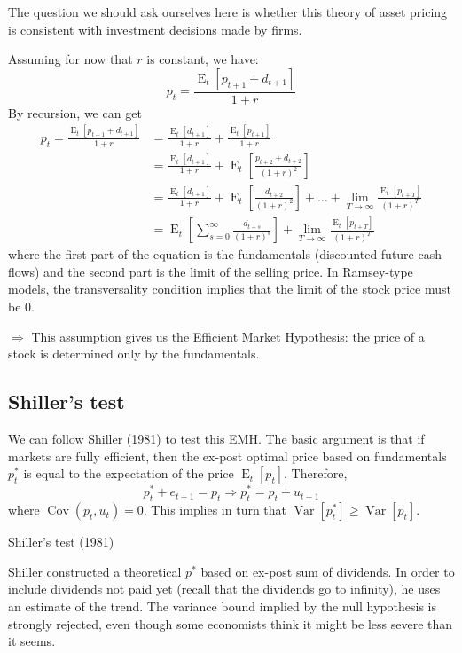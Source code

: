 \documentclass[12pt]{report}
\newcommand{\Et}[1]{\operatorname{E}_t\left[#1\right]}
\newcommand{\V}[1]{\operatorname{Var}\left[#1\right]}
\newcommand{\cov}[1]{\operatorname{Cov}\left(#1\right)}
\begin{document}
The question we should ask ourselves here is whether this theory of asset pricing is consistent with investment decisions made by firms.

Assuming for now that $r$ is constant, we have: $$p_t = \frac{\Et{p_{t+1} + d_{t+1}}}{1+r} $$
By recursion, we can get \begin{align*}
p_t = \frac{\Et{p_{t+1} + d_{t+1}}}{1+r} & = \frac{\Et{d_{t+1}}}{1+r} + \frac{\Et{p_{t+1}}}{1+r}\\
& = \frac{\Et{d_{t+1}}}{1+r} + \Et{\frac{{p_{t+2} + d_{t+2}}}{(1+r)^2}} \\
& = \frac{\Et{d_{t+1}}}{1+r} + \Et{\frac{{d_{t+2}}}{(1+r)^2}} + \hdots + \lim_{T\to\infty}\frac{\Et{p_{t+T}}}{(1+r)^T} \\
& = \Et{\sum_{s=0}^{\infty}\frac{d_{t+s}}{(1+r)^s}} + \lim_{T\to\infty}\frac{\Et{p_{t+T}}}{(1+r)^T}
\end{align*} where the first part of the equation is the fundamentals (discounted future cash flows) and the second part is the limit of the selling price. In Ramsey-type models, the transversality condition implies that the limit of the stock price must be $0$.\begin{center}
$\Rightarrow$ This assumption gives us the Efficient Market Hypothesis: the price of a stock is determined only by the fundamentals.
\end{center}

\subsection{Shiller's test}

We can follow Shiller (1981) to test this EMH. The basic argument is that if markets are fully efficient, then the ex-post optimal price based on fundamentals $p_t^*$ is equal to the expectation of the price $\Et{p_t}$. Therefore, $$ p_t^* + e_{t+1} = p_t \Rightarrow p_t^* = p_t + u_{t+1} $$ where $\cov{p_t, u_t} = 0$. This implies in turn that $\V{p_t^*} \geq \V{p_t}$.

\begin{bclogo}[couleur=blue!10, arrondi=0.1, logo=,ombre=false]{ Shiller's test (1981)} 

Shiller constructed a theoretical $p^*$ based on ex-post sum of dividends. In order to include dividends not paid yet (recall that the dividends go to infinity), he uses an estimate of the trend. The variance bound implied by the null hypothesis is strongly rejected, even though some economists think it might be less severe than it seems.
\end{bclogo}
\end{document}
